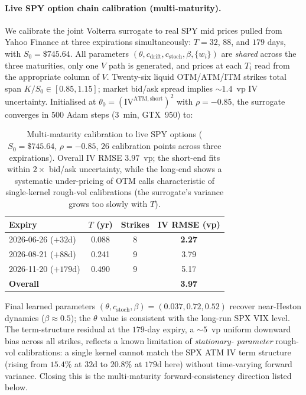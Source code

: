 \documentclass[11pt,a4paper]{article}
\begin{document}
\paragraph{Live SPY option chain calibration (multi-maturity).}
We calibrate the joint Volterra surrogate to real SPY mid prices pulled
from Yahoo Finance at three expirations simultaneously: $T = 32$, $88$,
and $179$ days, with $S_0 = \$745.64$. All parameters
$(\theta, c_{\mathrm{drift}}, c_{\mathrm{stoch}}, \beta, \{w_i\})$
are \emph{shared} across the three maturities, only one $V$ path is
generated, and prices at each $T_i$ read from the appropriate column of
$V$. Twenty-six liquid OTM/ATM/ITM strikes total span
$K/S_0 \in [0.85, 1.15]$; market bid/ask spread implies $\sim\!1.4$~vp
IV uncertainty. Initialised at
$\theta_0 = (\mathrm{IV}^{\mathrm{ATM, short}})^2$ with $\rho = -0.85$,
the surrogate converges in $500$ Adam steps ($3$~min, GTX~950) to:

\begin{table}[h]
\centering
\caption{Multi-maturity calibration to live SPY options
($S_0 = \$745.64$, $\rho = -0.85$, $26$ calibration points across three
expirations). Overall IV RMSE $3.97$~vp; the short-end fits within
$2\times$ bid/ask uncertainty, while the long-end shows a systematic
under-pricing of OTM calls characteristic of single-kernel rough-vol
calibrations (the surrogate's variance grows too slowly with $T$).}
\label{tab:spy-multi}
\begin{tabular}{lccc}
\toprule
Expiry & $T$ (yr) & Strikes & IV RMSE (vp) \\
\midrule
2026-06-26 ($+32$d) & 0.088 & 8 & \textbf{2.27} \\
2026-08-21 ($+88$d) & 0.241 & 9 & 3.79 \\
2026-11-20 ($+179$d) & 0.490 & 9 & 5.17 \\
\midrule
\multicolumn{3}{l}{\textbf{Overall}} & \textbf{3.97} \\
\bottomrule
\end{tabular}
\end{table}

Final learned parameters
$(\theta, c_{\mathrm{stoch}}, \beta) = (0.037, 0.72, 0.52)$ recover
near-Heston dynamics ($\beta \approx 0.5$); the $\theta$ value is
consistent with the long-run SPX VIX level. The term-structure
residual at the $179$-day expiry, a $\sim 5$~vp uniform downward bias
across all strikes, reflects a known limitation of \emph{stationary-
parameter} rough-vol calibrations: a single kernel cannot match the
SPX ATM IV term structure (rising from $15.4\%$ at $32$d to $20.8\%$ at
$179$d here) without time-varying forward variance. Closing this is
the multi-maturity forward-consistency direction listed below.
\end{document}
